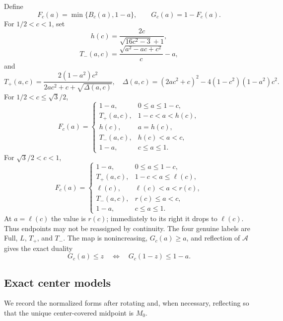 Define
\[
 F_c(a)=\min\{B_c(a),1-a\},\qquad G_c(a)=1-F_c(a).
\]
For $1/2<c<1$, set
\[
 h(c)=\frac{2c}{\sqrt{16c^2-3}+1},
\]
\[
 T_-(a,c)=\frac{\sqrt{a^2-ac+c^2}}c-a,
\]
and
\[
 T_+(a,c)=
 \frac{2(1-a^2)c^2}{2ac^2+c+\sqrt{\Delta(a,c)}},
 \quad
 \Delta(a,c)=(2ac^2+c)^2-4(1-c^2)(1-a^2)c^2.
\]
For $1/2<c\le\sqrt3/2$,
\begin{equation}
 F_c(a)=
 \begin{cases}
 1-a,&0\le a\le1-c,\\
 T_+(a,c),&1-c<a<h(c),\\
 h(c),&a=h(c),\\
 T_-(a,c),&h(c)<a<c,\\
 1-a,&c\le a\le1.
 \end{cases}
 \label{eq:capped-map-low}
\end{equation}
For $\sqrt3/2<c<1$,
\begin{equation}
 F_c(a)=
 \begin{cases}
 1-a,&0\le a\le1-c,\\
 T_+(a,c),&1-c<a\le\ell(c),\\
 \ell(c),&\ell(c)<a<r(c),\\
 T_-(a,c),&r(c)\le a<c,\\
 1-a,&c\le a\le1.
 \end{cases}
 \label{eq:capped-map-high}
\end{equation}
At $a=\ell(c)$ the value is $r(c)$; immediately to its right it drops to
$\ell(c)$.  Thus endpoints may not be reassigned by continuity.  The four
genuine labels are Full, $L$, $T_+$, and $T_-$.  The map is nonincreasing,
$G_c(a)\ge a$, and reflection of $\mathcal A$ gives the exact duality
\begin{equation}
 G_c(a)\le z\quad\Longleftrightarrow\quad
 G_c(1-z)\le1-a.
 \label{eq:capped-duality}
\end{equation}

\subsection{Exact center models}

We record the normalized forms after rotating and, when necessary,
reflecting so that the unique center-covered midpoint is $M_0$.

